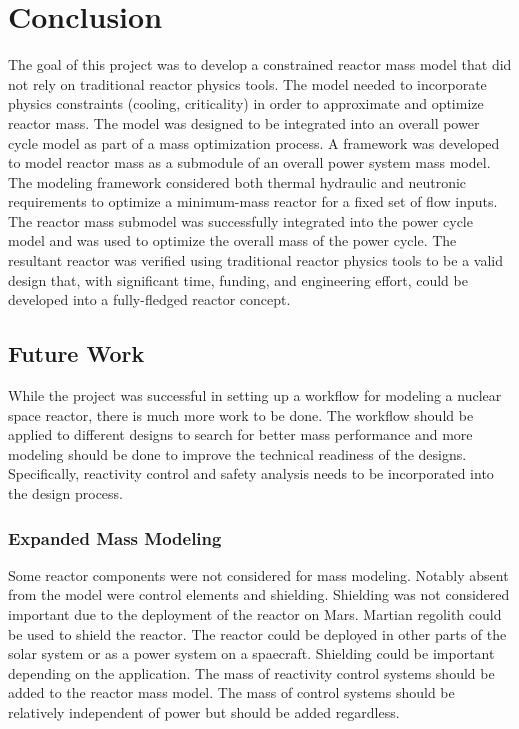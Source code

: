 \chapter{Conclusion}
The goal of this project was to develop a constrained reactor mass model that did not rely
on traditional reactor physics tools. The model needed to incorporate physics
constraints (cooling, criticality) in order to approximate and optimize reactor
mass. The model was designed to be integrated
into an overall power cycle model as part of a mass optimization process. A
framework was developed to model reactor mass as a submodule of an overall
power system mass model. The modeling framework considered both thermal
hydraulic and neutronic requirements to optimize a minimum-mass reactor for a
fixed set of flow inputs. The reactor mass submodel was successfully integrated
into the power cycle model and was used to optimize the overall mass of the
power cycle. The resultant reactor was verified using traditional reactor
physics tools to be a valid design that, with significant time, funding, and
engineering effort, could be developed into a fully-fledged reactor concept.

\section{Future Work}
While the project was successful in setting up a workflow for modeling a nuclear
space reactor, there is much more work to be done. The workflow should be
applied to different designs to search for better mass performance and more
modeling should be done to improve the technical readiness of the designs.
Specifically, reactivity control and safety analysis needs to be incorporated
into the design process.

\subsection{Expanded Mass Modeling}
Some reactor components were not considered for mass modeling. Notably absent
from the model were control elements and shielding. Shielding was not considered
important due to the deployment of the reactor on Mars. Martian regolith could
be used to shield the reactor. The reactor could be deployed in other parts of
the solar system or as a power system on a spaecraft. Shielding could be
important depending on the application. The mass of reactivity control systems
should be added to the reactor mass model. The mass of control systems should be relatively independent
of power but should be added regardless.

